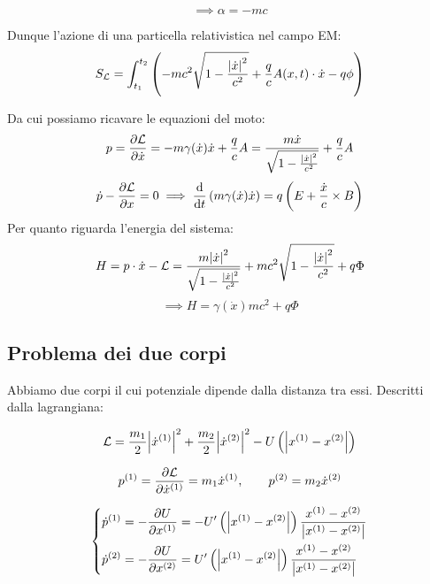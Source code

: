 \begin{equation}
\implies \alpha = -mc
\end{equation}

Dunque l'azione di una particella relativistica nel campo EM:
\begin{equation}
    S_\mathcal{L}= \int_{t_1}^{t_2}\left( -mc^2\sqrt{1-\frac{\abs{\dot{x}}^2}{c^2}}+ \frac{q}{c}A(x,t)\cdot \dot{x}-q\phi \right)
\end{equation}

Da cui possiamo ricavare le equazioni del moto:
\begin{equation}
    p = \pdv{\mathcal{L}}{\dot{x}} = -m \gamma(\dot{x})\dot{x}+\frac{q}{c}A 
    = \frac{m\dot{x}}{\sqrt{1-\frac{\abs{\dot{x}}^2}{c^2}}}+\frac{q}{c}A
\end{equation}
\begin{equation}
    \dot{p}-\pdv{\mathcal{L}}{x}= 0\implies \dv{t}\left( m\gamma(\dot{x})\dot{x} \right)=q\left( E+\frac{\dot{x}}{c}\times B \right)
\end{equation}
Per quanto riguarda l'energia del sistema:
\begin{equation}
    H=p\cdot \dot{x}-\mathcal{L}
    =\frac{m\abs{\dot{x}}^2}{\sqrt{1-\frac{\abs{\dot{x}}^2}{c^2}}}+mc^2\sqrt{1-\frac{\abs{\dot{x}}^2}{c^2}}+q\Phi
\end{equation}
\begin{equation}
    \implies H=\gamma(\dot{x})mc^2+q\Phi
\end{equation}



\subsection{Problema dei due corpi}

Abbiamo due corpi il cui potenziale dipende dalla distanza tra essi. Descritti dalla lagrangiana:

\begin{equation}
\mathcal{L} = \frac{m_1}{2}\abs{\dot{x}^{(1)}}^2 + \frac{m_2}{2}\abs{\dot{x}^{(2)}}^2 - U\left( \abs{x^{(1)}-x^{(2)}} \right)
\end{equation}

\begin{equation}
    p^{(1)} = \pdv{\mathcal{L}}{\dot{x}^{(1)}} = m_1 \dot{x}^{(1)}, 
    \qquad p^{(2)} = m_2 \dot{x}^{(2)}
\end{equation}

\begin{equation}
    \left\{
        \begin{aligned}
            \dot{p}^{(1)} &= - \pdv{U}{x^{(1)}} 
            = - U'\left( \abs{x^{(1)}-x^{(2)}} \right) 
            \frac{x^{(1)}-x^{(2)}}{\abs{x^{(1)}-x^{(2)}}} \\
            \dot{p}^{(2)} &= - \pdv{U}{x^{(2)}} 
            = U'\left( \abs{x^{(1)}-x^{(2)}} \right) 
            \frac{x^{(1)}-x^{(2)}}{\abs{x^{(1)}-x^{(2)}}}
        \end{aligned}
    \right.
\end{equation}

